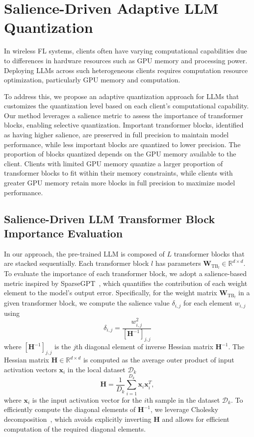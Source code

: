 \documentclass[journal]{IEEEtran}
\begin{document}
\section{Salience-Driven Adaptive LLM Quantization}
In wireless FL systems, clients often have varying computational capabilities due to differences in hardware resources such as GPU memory and processing power. Deploying LLMs across such heterogeneous clients requires computation resource optimization, particularly GPU memory and computation.

To address this, we propose an adaptive quantization approach for LLMs that customizes the quantization level based on each client's computational capability. Our method leverages a salience metric to assess the importance of transformer blocks, enabling selective quantization. Important transformer blocks, identified as having higher salience, are preserved in full precision to maintain model performance, while less important blocks are quantized to lower precision.  
The proportion of blocks quantized depends on the GPU memory available to the client. Clients with limited GPU memory quantize a larger proportion of transformer blocks to fit within their memory constraints, while clients with greater GPU memory retain more blocks in full precision to maximize model performance. 


\subsection{Salience-Driven LLM Transformer Block Importance Evaluation}
In our approach, the pre-trained LLM is composed of \( L \) transformer blocks that are stacked sequentially. Each transformer block \( l \) has parameters \( \mathbf{W}_{\text{TB}_l} \in \mathbb{R}^{d \times d} \). To evaluate the importance of each transformer block, we adopt a salience-based metric inspired by SparseGPT~\cite{DBLP:conf/icml/FrantarA23}, which quantifies the contribution of each weight element to the model's output error.
Specifically, for the weight matrix \( \mathbf{W}_{\text{TB}_l} \) in a given transformer block, we compute the salience value \( \delta_{i,j} \) for each element \( w_{i,j} \) using
\begin{equation}
\delta_{i,j} = \frac{w_{i,j}^2}{[\mathbf{H}^{-1}]_{j,j}}
\end{equation}
where \( [\mathbf{H}^{-1}]_{j,j} \) is the \( j \)th diagonal element of inverse Hessian matrix \( \mathbf{H}^{-1} \). 
The Hessian matrix \( \mathbf{H} \in \mathbb{R}^{d \times d} \) is computed as the average outer product of input activation vectors \( \mathbf{x}_i \) in the local dataset \( \mathcal{D}_k \)
\begin{equation}
\mathbf{H} = \frac{1}{D_k} \sum_{i=1}^{D_k} \mathbf{x}_i \mathbf{x}_i^T,
\end{equation}
where \( \mathbf{x}_i \) is the input activation vector for the \( i \)th sample in the dataset \( \mathcal{D}_k \). To efficiently compute the diagonal elements of \( \mathbf{H}^{-1} \), we leverage Cholesky decomposition~\cite{6710599}, which avoids explicitly inverting \( \mathbf{H} \) and allows for efficient computation of the required diagonal elements.
\end{document}

